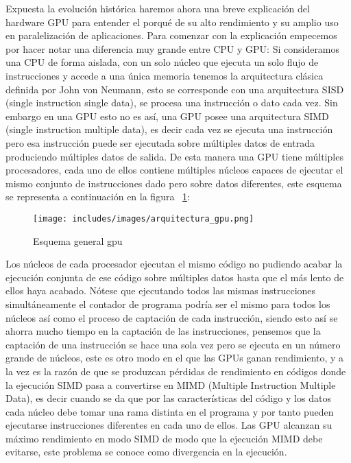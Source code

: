 Expuesta la evolución histórica haremos ahora una breve explicación del hardware GPU para entender el porqué de su alto rendimiento y su amplio uso en paralelización de aplicaciones. Para comenzar con la explicación empecemos por hacer notar una diferencia muy grande entre CPU y GPU: Si consideramos una CPU de forma aislada, con un solo núcleo que ejecuta un solo flujo de instrucciones y accede a una única memoria tenemos la arquitectura clásica definida por John von Neumann, esto se corresponde con una arquitectura SISD (single instruction single data), se procesa una instrucción o dato cada vez. Sin embargo en una GPU esto no es así, una GPU posee una arquitectura SIMD (single instruction multiple data), es decir cada vez se ejecuta una instrucción pero esa instrucción puede ser ejecutada sobre múltiples datos de entrada produciendo múltiples datos de salida.
De esta manera una GPU tiene múltiples procesadores, cada uno de ellos contiene múltiples núcleos capaces de ejecutar el mismo conjunto de instrucciones dado pero sobre datos diferentes, este esquema se representa a continuación en la figura ~\ref{fig:arquitecturaGPU}:

\begin{figure}[tph]
\centering
\texttt{[image: includes/images/arquitectura\_gpu.png]}
\caption{Esquema general gpu}
\label{fig:arquitecturaGPU}
\end{figure}

Los núcleos de cada procesador ejecutan el mismo código no pudiendo acabar la ejecución conjunta de ese código sobre múltiples datos hasta que el más lento de ellos haya acabado.
Nótese que ejecutando todos las mismas instrucciones simultáneamente el contador de programa podría ser el mismo para todos los núcleos así como el proceso de captación de cada instrucción, siendo esto así se ahorra mucho tiempo en la captación de las instrucciones, pensemos que la captación de una instrucción se hace una sola vez pero se ejecuta en un número grande de núcleos, este es otro modo en el que las GPUs ganan rendimiento, y a la vez es la razón de que se produzcan pérdidas de rendimiento en códigos donde la ejecución SIMD pasa a convertirse en MIMD (Multiple Instruction Multiple Data), es decir cuando se da que por las características del código y los datos cada núcleo debe tomar una rama distinta en el programa y por tanto pueden ejecutarse instrucciones diferentes en cada uno de ellos. Las GPU alcanzan su máximo rendimiento en modo SIMD de modo que la ejecución MIMD debe evitarse, este problema se conoce como divergencia en la ejecución.

